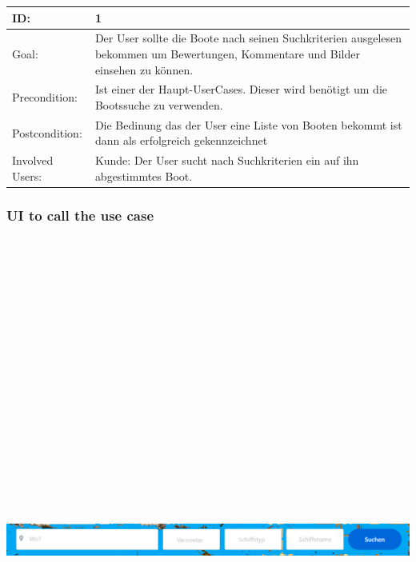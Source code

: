 \documentclass[12pt]{article}
\theoremstyle{definition}
\begin{document}
\begin{tabular}{|p{.2\linewidth}|p{.65\linewidth}|}
\hline 
ID: & 1 \\ \hline
Goal: & Der User sollte die Boote nach seinen Suchkriterien ausgelesen bekommen um Bewertungen, Kommentare und Bilder einsehen zu können. \\ \hline
Precondition: & Ist einer der Haupt-UserCases. Dieser wird benötigt um die Bootssuche zu verwenden. \\ \hline
Postcondition: & Die Bedinung das der User eine Liste von Booten bekommt ist dann als erfolgreich gekennzeichnet \\ \hline
Involved Users: &Kunde: Der User sucht nach Suchkriterien ein auf ihn abgestimmtes Boot. \\ \hline
\end{tabular}

\subsubsection{UI to call the use case}
\begin{center}\includegraphics[width=15cm,height=20cm,keepaspectratio]{Startseite2.png}\end{center}
\end{document}
